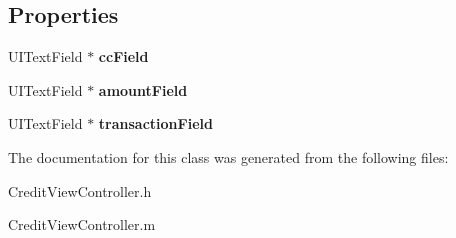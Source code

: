 \subsection*{Properties}
\begin{DoxyCompactItemize}
\item 
\hypertarget{interface_credit_view_controller_a304689f21564f38a4ec65b72650703b0}{
UITextField $\ast$ {\bfseries ccField}}
\label{interface_credit_view_controller_a304689f21564f38a4ec65b72650703b0}

\item 
\hypertarget{interface_credit_view_controller_a9e46abd5eb2f8d26fd8386e21d153527}{
UITextField $\ast$ {\bfseries amountField}}
\label{interface_credit_view_controller_a9e46abd5eb2f8d26fd8386e21d153527}

\item 
\hypertarget{interface_credit_view_controller_a7afd194aac2b698df203c3fe68ee51fe}{
UITextField $\ast$ {\bfseries transactionField}}
\label{interface_credit_view_controller_a7afd194aac2b698df203c3fe68ee51fe}

\end{DoxyCompactItemize}


The documentation for this class was generated from the following files:\begin{DoxyCompactItemize}
\item 
CreditViewController.h\item 
CreditViewController.m\end{DoxyCompactItemize}
